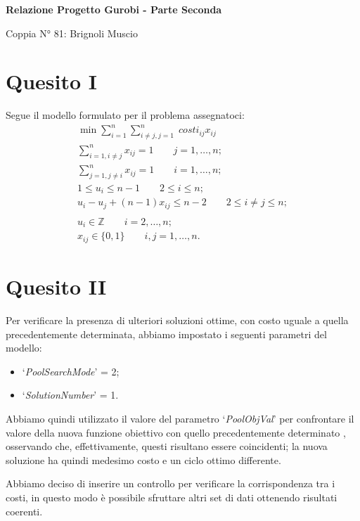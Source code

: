 \documentclass[12pt]{article}
\begin{document}
  \begin{center}
    \Large\textbf{Relazione Progetto Gurobi - Parte Seconda}

    \small Coppia N° 81: Brignoli Muscio
  \end{center}

  \section*{Quesito I}
  Segue il modello formulato per il problema assegnatoci:
  \begin{gather*}
    \min\sum_{i=1}^n \sum_{i\neq j,j=1}^n\; costi_{ij}x_{ij}\\
    \sum_{i=1,i\neq j}^n x_{ij}=1\qquad j=1,\dots,n;\\
    \sum_{j=1,j\neq i}^n x_{ij}=1\qquad i=1,\dots,n;\\
    1\leq u_i\leq n-1\qquad 2\leq i\leq n;\\
    u_i-u_j+(n-1)x_{ij}\leq n-2\qquad 2\leq i\neq j\leq n;\\\\
    u_i\in\mathbb{Z}\qquad i=2,\dots,n;\\
    x_{ij}\in\{0,1\}\qquad i,j=1,\dots,n.
  \end{gather*}

  \section*{Quesito II}
  Per verificare la presenza di ulteriori soluzioni ottime, con costo uguale a quella precedentemente determinata, abbiamo impostato i seguenti parametri del modello:
  \begin{itemize}
    \item `\textit{PoolSearchMode}' = 2;
    \item `\textit{SolutionNumber}' = 1.
  \end{itemize}

  Abbiamo quindi utilizzato il valore del parametro `\textit{PoolObjVal}' per confrontare il valore della nuova funzione obiettivo con quello precedentemente determinato , osservando che, effettivamente, questi risultano essere coincidenti; la nuova soluzione ha quindi medesimo costo e un ciclo ottimo differente.

  Abbiamo deciso di inserire un controllo per verificare la corrispondenza tra i costi, in questo modo è possibile sfruttare altri set di dati ottenendo risultati coerenti.

  \newpage
\end{document}
